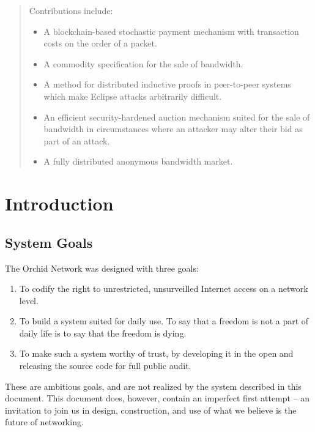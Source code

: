\documentclass{article}
\newcommand{\orchid}{Orchid}
\newcommand{\Orchid}{\orchid}
\begin{document}
\begin{abstract}
  Contributions include:

  \begin{itemize}
  \item A blockchain-based stochastic payment mechanism with
    transaction costs on the order of a packet.
  \item A commodity specification for the sale of bandwidth.
  \item A method for distributed inductive proofs in peer-to-peer
    systems which make Eclipse attacks arbitrarily difficult.
  \item An efficient security-hardened auction mechanism suited for
    the sale of bandwidth in circumstances where an attacker may alter
    their bid as part of an attack.
  \item A fully distributed anonymous bandwidth market.
  \end{itemize}

\end{abstract}


\newpage
\tableofcontents
\newpage


\section{Introduction}
\label{sec:overview}

\subsection{System Goals}

The \Orchid{} Network was designed with three goals:

\begin{enumerate}
\item To codify the right to unrestricted, unsurveilled Internet access on a network level.
\item To build a system suited for daily use. To say that a freedom is not a part of daily life is to say that the freedom is dying.
\item To make such a system worthy of trust, by developing it in the open and releasing the source code for full public audit.
\end{enumerate}

These are ambitious goals, and are not realized by the system described in this document. This document does, however, contain an imperfect first attempt – an invitation to join us in design, construction, and use of what we believe is the future of networking.
\end{document}

